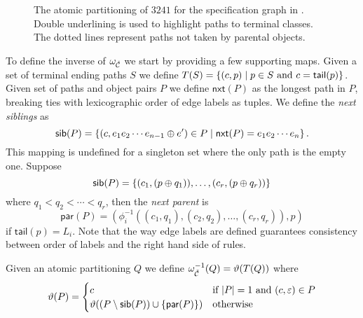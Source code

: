\begin{figure}[ht!]
    \centering
    
    \caption{The atomic partitioning of $3241$ for the specification graph in . Double underlining is used to highlight paths to terminal classes. The dotted lines represent paths not taken by parental objects.}
    \label{fig:atomic_partitioning}
\end{figure}

To define the inverse of $\omega_{\check{\mathcal{C}}}$ we start by providing a few supporting maps. Given a set of terminal ending paths $S$ we define $T(S) = \left\{(c,p) \mid p \in S \text{ and } c = \textsf{tail}(p)\right\}$. Given set of paths and object pairs $P$ we define $\textsf{nxt}(P)$ as the longest path in $P$, breaking ties with lexicographic order of edge labels as tuples. We define the \emph{next siblings} as
\[
    \textsf{sib}(P) = \left\{(c, e_1e_2 \dotsm e_{n-1} \oplus e') \in P \mid \textsf{nxt}(P) = e_1e_2 \dotsm e_n\right\}.
\]
This mapping is undefined for a singleton set where the only path is the empty one. Suppose
\[
    \textsf{sib}(P) = \left\{(c_1, (p \oplus q_1)),\dotsc, (c_r, (p \oplus q_r))\right\}
\]
where $q_1 < q_2 < \dotsm < q_r$, then the \emph{next parent} is
\[
    \textsf{par}(P) = (\phi^{-1}_i((c_1,q_1), (c_2,q_2), \dotsc, (c_r,q_r)),p)
\]
if $\textsf{tail}(p) = L_i$. Note that the way edge labels are defined guarantees consistency between order of labels and the right hand side of rules.

Given an atomic partitioning $Q$ we define $\omega^{-1}_{\check{\mathcal{C}}}(Q) = \vartheta(T(Q))$ where
\[
    \vartheta(P) = \begin{cases}
        c & \text{if } |P| = 1 \text{ and } (c, \varepsilon) \in P\\
        \vartheta(\left(P \setminus \textsf{sib}(P)\right) \cup \left\{\textsf{par}(P)\right\}) & \text{otherwise}
    \end{cases}
\]

